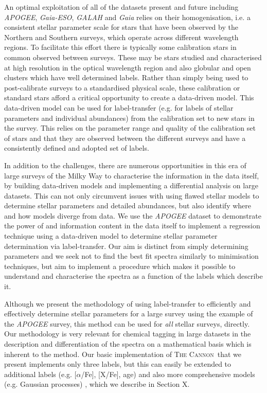 \documentclass[12pt, preprint]{aastex}
\newcommand{\tc}{\textsc{The Cannon}}
\begin{document}
An optimal exploitation of all of the datasets present and future including \textit{APOGEE}, \textit{Gaia-ESO}, \textit{GALAH} and \textit{Gaia} relies on their homogenisation, i.e. a consistent stellar parameter scale for stars that have been observed by the Northern and Southern surveys, which operate across different wavelength regions. To facilitate this effort there is typically some calibration stars in common observed between surveys. These may be stars studied and characterised at high resolution in the optical wavelength region and also globular and open clusters which have well determined labels. Rather than simply being used to post-calibrate surveys to a standardised physical scale, these calibration or standard stars afford a critical opportunity to create a data-driven model.  This data-driven model can be used for label-transfer (e.g. for labels of stellar parameters and individual abundances) from the calibration set to new stars in the survey. This relies on the parameter range and quality of the calibration set of stars and that they are observed between the different surveys and have a consistently defined and adopted set of labels. 

In addition to the challenges, there are numerous opportunities in this era of large surveys of the Milky Way to characterise the information in the data itself, by building data-driven models and implementing a differential analysis on large datasets. This can not only circumvent issues with using flawed stellar models to determine stellar parameters and detailed abundances, but also identify where and how models diverge from data. We use the \textit{APOGEE} dataset to demonstrate the power of and information content in the data itself to implement a regression technique using a data-driven model to determine stellar parameter determination via label-transfer. Our aim is distinct from simply determining parameters and we seek not to find the best fit spectra similarly to minimisation techniques, but aim to implement a procedure which makes it possible to understand and characterise the spectra as a function of the labels which describe it. %

Although we present the methodology of using label-transfer to efficiently and effectively determine stellar parameters for a large survey using the example of the \textit{APOGEE} survey, this method can be used for \textit{all} stellar surveys, directly.  Our methodology is very relevant for chemical tagging in large datasets in the description and differentiation of the spectra on a mathematical basis which is inherent to the method.  Our basic implementation of \tc\ that we present implements only three labels, but this can easily be extended to additional labels  (e.g. [$\alpha$/Fe], [X/Fe], age) and also more comprehensive models (e.g. Gaussian processes) , which we describe in Section X. %
\end{document}
